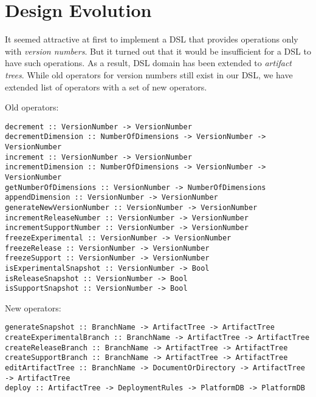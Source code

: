 \documentclass[11pt]{article}
\begin{document}




\section{Design Evolution}
\label{sec:evol}
It seemed attractive at first to implement a DSL that provides operations only with \textit{version numbers}. But it turned out that it would be insufficient for a DSL to have such operations. As a result, DSL domain has been extended to \textit{artifact trees}. While old operators for version numbers still exist in our DSL, we have extended list of operators with a set of new operators. 

Old operators:
\begin{lstlisting}[style=Haskell]
decrement :: VersionNumber -> VersionNumber
decrementDimension :: NumberOfDimensions -> VersionNumber -> VersionNumber
increment :: VersionNumber -> VersionNumber
incrementDimension :: NumberOfDimensions -> VersionNumber -> VersionNumber
getNumberOfDimensions :: VersionNumber -> NumberOfDimensions
appendDimension :: VersionNumber -> VersionNumber
generateNewVersionNumber :: VersionNumber -> VersionNumber
incrementReleaseNumber :: VersionNumber -> VersionNumber
incrementSupportNumber :: VersionNumber -> VersionNumber
freezeExperimental :: VersionNumber -> VersionNumber
freezeRelease :: VersionNumber -> VersionNumber
freezeSupport :: VersionNumber -> VersionNumber
isExperimentalSnapshot :: VersionNumber -> Bool
isReleaseSnapshot :: VersionNumber -> Bool
isSupportSnapshot :: VersionNumber -> Bool
\end{lstlisting}

New operators:
\begin{lstlisting}[style=Haskell]
generateSnapshot :: BranchName -> ArtifactTree -> ArtifactTree
createExperimentalBranch :: BranchName -> ArtifactTree -> ArtifactTree
createReleaseBranch :: BranchName -> ArtifactTree -> ArtifactTree
createSupportBranch :: BranchName -> ArtifactTree -> ArtifactTree
editArtifactTree :: BranchName -> DocumentOrDirectory -> ArtifactTree -> ArtifactTree
deploy :: ArtifactTree -> DeploymentRules -> PlatformDB -> PlatformDB
\end{lstlisting}
\end{document}
